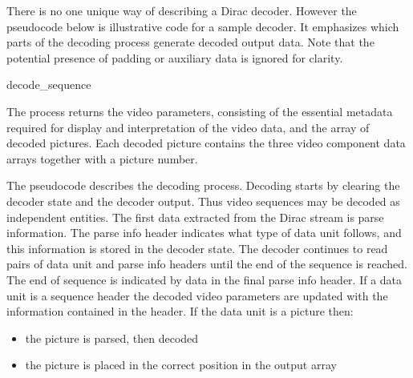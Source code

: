 \label{sequencedecoding}

There is no one unique way of describing a Dirac decoder. However the pseudocode 
below is illustrative code for a sample decoder. It emphasizes which parts of the decoding
 process generate decoded output data. Note that the potential presence of padding or auxiliary data is ignored for clarity.

\begin{pseudo}{decode\_sequence}{}
   \bsCODE{\StateName=\{\}}
   \bsCODE{\RefBuffer=\{\}}
      \bsEND
   \bsEND
\end{pseudo}

The process returns the video parameters, consisting of the essential metadata required for 
display and interpretation of the video data, and the array of decoded pictures. Each decoded picture contains the three video component data arrays together with a picture number.

The pseudocode describes the decoding process. Decoding starts by clearing the 
decoder state and the decoder output. Thus video sequences may be decoded as independent entities. The first data extracted from the Dirac stream is parse information. The parse info header indicates what type of data unit follows, and this information is stored in the decoder state. The decoder continues to read pairs of data unit and parse info 
headers until the end of the sequence is reached. The end of sequence 
is indicated by data in the final parse info header. If a data unit is a sequence header the 
decoded video parameters are updated with the information contained in the header. If the 
data unit is a picture then:
\begin{itemize}
\item the picture is parsed, then decoded
\item the picture is placed in the correct position in the output array
\end{itemize}

